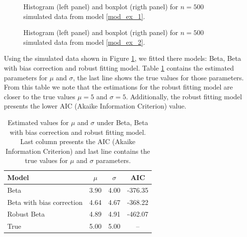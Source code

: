 \documentclass{article}
\begin{document}
\begin{figure}[htp]
\centering
{}
\caption{\label{data_example_1} Histogram (left panel) and boxplot (rigth panel) for $n=500$ simulated data from model \eqref{mod_ex_1}.}
\end{figure}

\begin{figure}[htp]
\centering
{}
\caption{\label{data_example_2} Histogram (left panel) and boxplot (rigth panel) for $n=500$ simulated data from model \eqref{mod_ex_2}.}
\end{figure}

Using the simulated data shown in Figure \ref{data_example_1}, we fitted there models: Beta, Beta with bias correction and robust fitting model. Table \ref{res_example_1} contains the estimated parameters for $\mu$ and $\sigma$, the last line shows the true values for those parameters. From this table we note that the estimations for the robust fitting model are closer to the true values $\mu=5$ and $\sigma=5$. Additionally, the robust fitting model presents the lower AIC (Akaike Information Criterion) value.

\begin{table}[ht] 
\centering
\begin{tabular}{lccc} \hline
Model & $\mu$ & $\sigma$ & AIC \\ \hline
Beta & 3.90 & 4.00 & -376.35 \\ 
Beta with bias correction & 4.64 & 4.67 & -368.22 \\ 
Robust Beta & 4.89 & 4.91 & -462.07 \\ 
True & 5.00 & 5.00 & -- \\ \hline
\end{tabular}
\caption{Estimated values for $\mu$ and $\sigma$ under Beta, Beta with bias correction and robust fitting model. Last column presents the AIC (Akaike Information Criterion) and last line contains the true values for $\mu$ and $\sigma$ parameters.}
\label{res_example_1}
\end{table}
\end{document}
